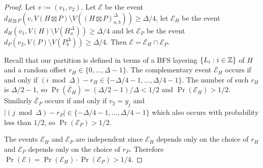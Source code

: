 \documentclass{patmorin}
\renewcommand{\ge}{\geqslant}
\begin{document}
\begin{proof}
  Let $v:=(v_1,v_2)$.
  Let $\mathcal{E}$ be the event $d_{H\boxtimes P}(v, V(H\boxtimes P)\setminus V((H\boxtimes P)_{a,b}^\Delta)) \ge \Delta/4$, let $\mathcal{E}_H$ be the event $d_{H}(v_1, V(H)\setminus V(H^\Delta_a))\ge\Delta/4$ and let $\mathcal{E}_P$ be the event $d_{P}(v_2, V(P)\setminus V(P^\Delta_b))\ge\Delta/4$.  Then $\mathcal{E}=\mathcal{E}_H\cap\mathcal{E}_P$.

  Recall that our partition is defined in terms of a BFS layering $\{L_i:i\in\mathbb{Z}\}$ of $H$ and a random offset $r_H\in\{0,\ldots,\Delta-1\}$.
  The complementary event $\overline{\mathcal{E}}_H$ occurs if and only if $(i\bmod\Delta)-r_H\in\{-\Delta/4-1,\ldots,\Delta/4-1\}$. The number of such $r_H$ is $\Delta/2-1$, so $\Pr(\overline{\mathcal{E}}_H)=(\Delta/2-1)/\Delta < 1/2$ and $\Pr(\mathcal{E}_H)>1/2$.  Similarly $\overline{\mathcal{E}}_P$ occurs if and only if $v_2=y_j$ and $|(j\bmod\Delta)-r_P|\in\{-\Delta/4-1,\ldots,\Delta/4-1\}$ which also occurs with probability less than $1/2$, so $\Pr(\mathcal{E}_P)> 1/2$.

  The events $\mathcal{E}_H$ and $\mathcal{E}_P$ are independent since $\mathcal{E}_H$ depends only on the choice of $r_H$ and $\mathcal{E}_P$ depends only on the choice of $r_P$.
  Therefore $\Pr(\mathcal{E})=\Pr(\mathcal{E}_H)\cdot\Pr(\mathcal{E}_P) > 1/4$.
\end{proof}
\end{document}
